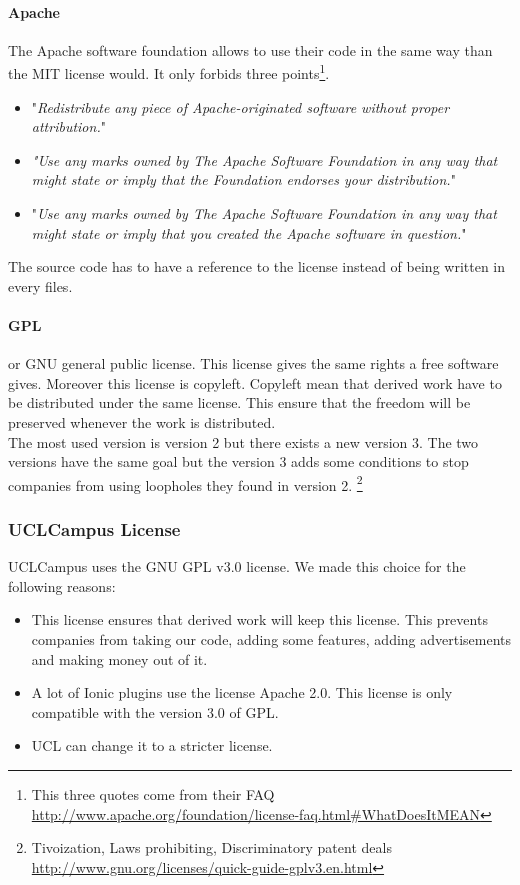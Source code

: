 \documentclass{eplmastersthesis}
\begin{document}
\paragraph{Apache}
The Apache software foundation allows to use their code  in the same way than the MIT license would. It only forbids three points\footnote{This three quotes come from their FAQ \url{http://www.apache.org/foundation/license-faq.html\#WhatDoesItMEAN}}.
\begin{itemize}
\item "\textit{Redistribute any piece of Apache-originated software without proper attribution.}"
\item \textit{"Use any marks owned by The Apache Software Foundation in any way that might state or imply that the Foundation endorses your distribution.}"
\item "\textit{Use any marks owned by The Apache Software Foundation in any way that might state or imply that you created the Apache software in question.}"
\end{itemize}
The source code has to have a reference to the license instead of being written in every files. 
\paragraph{GPL}
or GNU general public license. This license gives the same rights a free software gives. Moreover this license is copyleft. Copyleft mean that derived work have to be distributed under the same license. This ensure that the freedom will be preserved whenever the work is distributed.\\
The most used version is version 2 but there exists a new version 3. The two versions have the same goal but the version 3 adds some conditions to stop companies from using loopholes they found in version 2. \footnote{Tivoization, Laws prohibiting, Discriminatory patent deals \url{http://www.gnu.org/licenses/quick-guide-gplv3.en.html}}
\subsubsection{UCLCampus License}
UCLCampus uses the GNU GPL v3.0 license. We made this choice for the following reasons:
\begin{itemize}
\item This license ensures that derived work will keep this license. This prevents companies from taking our code, adding some features, adding advertisements and making money out of it.
\item A lot of Ionic plugins use the license Apache 2.0. This license is only compatible with the version 3.0 of GPL.
\item UCL can change it to a stricter license.
\end{itemize}
\end{document}
